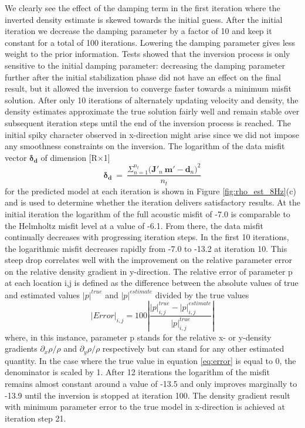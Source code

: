 \documentclass{article}
\begin{document}
	We clearly see the effect of the damping term in the first iteration where the inverted density estimate is skewed towards the initial guess. After the initial iteration we decrease the damping parameter by a factor of 10 and keep it constant for a total of 100 iterations. Lowering the damping parameter gives less weight to the prior information. Tests showed that the inversion process is only sensitive to the initial damping parameter: decreasing the damping parameter further after the initial stabilization phase did not have an effect on the final result, but it allowed the inversion to converge faster towards a minimum misfit solution. After only 10 iterations of alternately updating velocity and density, the density estimates approximate the true solution fairly well and remain stable over subsequent iteration steps until the end of the inversion process is reached. The initial spiky character observed in x-direction might arise since we did not impose any smoothness constraints on the inversion. The logarithm of the data misfit vector $\bm{\delta_{d}}$ of dimension [R$\times$1]
	\begin{equation}\label{eq:datamisfit}
		\bm{\delta_{d}} \: = \: \frac{\Sigma_{n=1}^{n_{t}} \big( \bm{J}'_{n} \: \bm{m}' - \bm{d}_{n} \big)^{2}}{n_{t}}
	\end{equation}
	for the predicted model at each iteration is shown in Figure \ref{fig:rho_est_8Hz}(c) and is used to determine whether the iteration delivers satisfactory results. At the initial iteration the logarithm of the full acoustic misfit of -7.0 is comparable to the Helmholtz misfit level at a value of -6.1. From there, the data misfit continually decreases with progressing iteration steps. In the first 10 iterations, the logarithmic misfit decreases rapidly from -7.0 to -13.2 at iteration 10. This steep drop correlates well with the improvement on the relative parameter error on the relative density gradient in y-direction. The relative error of parameter p at each location i,j is defined as the difference between the absolute values of true and estimated values $|p|^{true}$ and $|p|^{estimate}$ divided by the true values
	\begin{equation} \label{eq:error}
		|Error|_{i,j} = 100|\frac{|p|^{true}_{i,j} - |p|^{estimate}_{i,j}}{|p|^{true}_{i,j}}|
	\end{equation}
	where, in this instance, parameter p stands for the relative x- or y-density gradients  $\partial_{x} \rho/\rho$ and $\partial_{y} \rho/\rho$ respectively but can stand for any other estimated quantity. In the case where the true value in equation \eqref{eq:error} is equal to 0, the denominator is scaled by 1.  After 12 iterations the logarithm of the misfit remains almost constant around a value of -13.5 and only improves marginally to -13.9 until the inversion is stopped at iteration 100. The density gradient result with minimum parameter error to the true model in x-direction is achieved at iteration step 21. \\
	
\end{document}
